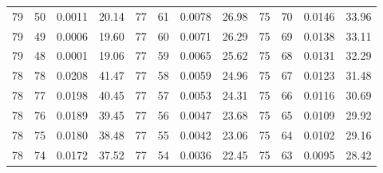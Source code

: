 \begin{tabular}{llll|llll|llll}
79 & 50 & 0.0011 & 20.14 & 77 & 61 & 0.0078 & 26.98 & 75 & 70 & 0.0146 & 33.96\\
79 & 49 & 0.0006 & 19.60 & 77 & 60 & 0.0071 & 26.29 & 75 & 69 & 0.0138 & 33.11\\
79 & 48 & 0.0001 & 19.06 & 77 & 59 & 0.0065 & 25.62 & 75 & 68 & 0.0131 & 32.29\\
78 & 78 & 0.0208 & 41.47 & 77 & 58 & 0.0059 & 24.96 & 75 & 67 & 0.0123 & 31.48\\
78 & 77 & 0.0198 & 40.45 & 77 & 57 & 0.0053 & 24.31 & 75 & 66 & 0.0116 & 30.69\\
78 & 76 & 0.0189 & 39.45 & 77 & 56 & 0.0047 & 23.68 & 75 & 65 & 0.0109 & 29.92\\
78 & 75 & 0.0180 & 38.48 & 77 & 55 & 0.0042 & 23.06 & 75 & 64 & 0.0102 & 29.16\\
78 & 74 & 0.0172 & 37.52 & 77 & 54 & 0.0036 & 22.45 & 75 & 63 & 0.0095 & 28.42\\
\bottomrule
\end{tabular}
\newpage
